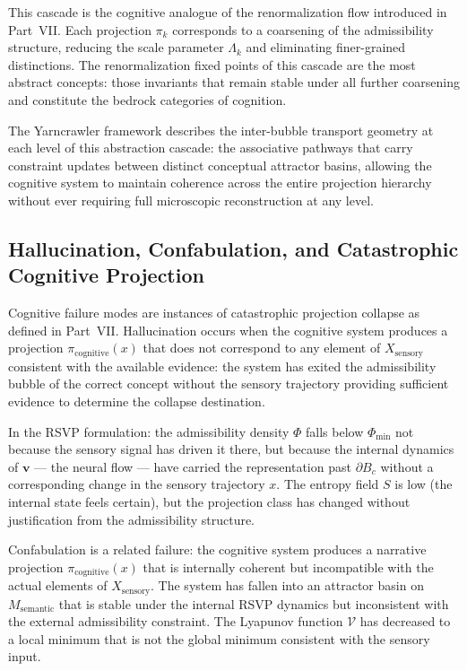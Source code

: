 \documentclass[12pt, a4paper]{article}
\theoremstyle{essaystyle}
\begin{document}
This cascade is the cognitive analogue of the renormalization flow introduced in
Part~VII. Each projection $\pi_k$ corresponds to a coarsening of the admissibility
structure, reducing the scale parameter $\Lambda_k$ and eliminating finer-grained
distinctions. The renormalization fixed points of this cascade are the most abstract
concepts: those invariants that remain stable under all further coarsening and
constitute the bedrock categories of cognition.

The Yarncrawler framework describes the inter-bubble transport geometry at each level
of this abstraction cascade: the associative pathways that carry constraint updates
between distinct conceptual attractor basins, allowing the cognitive system to maintain
coherence across the entire projection hierarchy without ever requiring full microscopic
reconstruction at any level.

\subsection{Hallucination, Confabulation, and Catastrophic Cognitive Projection}

Cognitive failure modes are instances of catastrophic projection collapse as defined
in Part~VII. Hallucination occurs when the cognitive system produces a projection
$\pi_{\mathrm{cognitive}}(x)$ that does not correspond to any element of
$X_{\mathrm{sensory}}$ consistent with the available evidence: the system has
exited the admissibility bubble of the correct concept without the sensory trajectory
providing sufficient evidence to determine the collapse destination.

In the RSVP formulation: the admissibility density $\Phi$ falls below $\Phi_{\min}$
not because the sensory signal has driven it there, but because the internal dynamics
of $\mathbf{v}$ --- the neural flow --- have carried the representation past $\partial B_c$
without a corresponding change in the sensory trajectory $x$. The entropy field $S$
is low (the internal state feels certain), but the projection class has changed without
justification from the admissibility structure.

Confabulation is a related failure: the cognitive system produces a narrative
projection $\pi_{\mathrm{cognitive}}(x)$ that is internally coherent but incompatible
with the actual elements of $X_{\mathrm{sensory}}$. The system has fallen into an
attractor basin on $M_{\mathrm{semantic}}$ that is stable under the internal RSVP
dynamics but inconsistent with the external admissibility constraint. The Lyapunov
function $\mathcal{V}$ has decreased to a local minimum that is not the global minimum
consistent with the sensory input.
\end{document}
